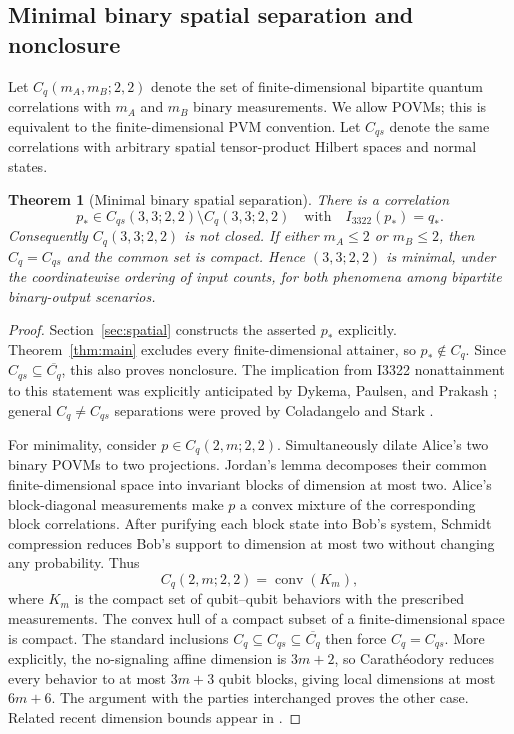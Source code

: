 \documentclass[11pt]{article}
\newtheorem{theorem}{Theorem}
\begin{document}
\subsection{Minimal binary spatial separation and nonclosure}

Let $C_q(m_A,m_B;2,2)$ denote the set of finite-dimensional bipartite quantum
correlations with $m_A$ and $m_B$ binary measurements.  We allow POVMs; this
is equivalent to the finite-dimensional PVM convention.  Let $C_{qs}$ denote
the same correlations with arbitrary spatial tensor-product Hilbert spaces
and normal states.

\begin{theorem}[Minimal binary spatial separation]\label{thm:nonclosure}
There is a correlation
\[
p_*\in C_{qs}(3,3;2,2)\setminus C_q(3,3;2,2)
\quad\text{with}\quad I_{3322}(p_*)=q_*.
\]
Consequently $C_q(3,3;2,2)$ is not closed.  If either $m_A\leq2$ or
$m_B\leq2$, then $C_q=C_{qs}$ and the common set is compact.  Hence
$(3,3;2,2)$ is minimal, under the coordinatewise ordering of input counts,
for both phenomena among bipartite binary-output scenarios.
\end{theorem}

\begin{proof}
Section~\ref{sec:spatial} constructs the asserted $p_*$ explicitly.
Theorem~\ref{thm:main} excludes every finite-dimensional attainer, so
$p_*\notin C_q$.  Since $C_{qs}\subseteq\overline{C_q}$, this also proves
nonclosure.  The implication from I3322 nonattainment to this statement was
explicitly anticipated by Dykema, Paulsen, and Prakash
\cite{DykemaPaulsenPrakash2018}; general $C_q\ne C_{qs}$ separations were
proved by Coladangelo and Stark \cite{ColadangeloStark2018}.

For minimality, consider $p\in C_q(2,m;2,2)$.  Simultaneously dilate Alice's
two binary POVMs to two projections.  Jordan's lemma decomposes their common
finite-dimensional space into invariant blocks of dimension at most two.
Alice's block-diagonal measurements make $p$ a convex mixture of the
corresponding block correlations.  After purifying each block state into
Bob's system, Schmidt compression reduces Bob's support to dimension at most
two without changing any probability.  Thus
\[
C_q(2,m;2,2)=\operatorname{conv}(K_m),
\]
where $K_m$ is the compact set of qubit--qubit behaviors with the prescribed
measurements.  The convex hull of a compact subset of a finite-dimensional
space is compact.  The standard inclusions
$C_q\subseteq C_{qs}\subseteq\overline{C_q}$ then force $C_q=C_{qs}$.
More explicitly, the no-signaling affine dimension is $3m+2$, so
Carath\'eodory reduces every behavior to at most $3m+3$ qubit blocks, giving
local dimensions at most $6m+6$.  The argument with the parties interchanged
proves the other case.  Related recent dimension bounds appear in
\cite{Masanes2005,PanahiEtAl2025}.
\end{proof}
\end{document}
